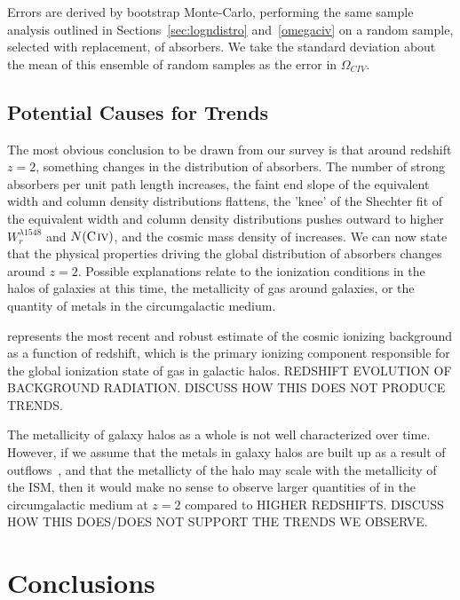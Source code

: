 \documentclass[linenumbers,twocolumn]{aastex61}
\begin{document}
Errors are derived by bootstrap Monte-Carlo, performing the same sample analysis outlined in Sections~\ref{sec:logndistro} and~\ref{omegaciv} on a random sample, selected with replacement, of {\CIV} absorbers.  We take the standard deviation about the mean of this ensemble of random samples as the error in $\Omega_{CIV}$.

\subsection{Potential Causes for Trends}
\label{trendcauses}

The most obvious conclusion to be drawn from our {\CIV} survey is that around redshift $z = 2$, something changes in the distribution of {\CIV} absorbers. The number of strong absorbers per unit path length increases, the faint end slope of the equivalent width and column density distributions flattens, the 'knee' of the Shechter fit of the equivalent width and column density distributions pushes outward to higher $W_r^{\lambda1548}$ and $N(\hbox{{\rm C}\kern 0.1em{\sc iv}})$, and the cosmic mass density of {\CIV} increases. We can now state that the physical properties driving the global distribution of {\CIV} absorbers changes around $z = 2$. Possible explanations relate to the ionization conditions in the halos of galaxies at this time, the metallicity of gas around galaxies, or the quantity of metals in the circumgalactic medium.

\cite{Haardt2012} represents the most recent and robust estimate of the cosmic ionizing background as a function of redshift, which is the primary ionizing component responsible for the global ionization state of gas in galactic halos. REDSHIFT EVOLUTION OF BACKGROUND RADIATION. DISCUSS HOW THIS DOES NOT PRODUCE TRENDS.

The metallicity of galaxy halos as a whole is not well characterized over time. However, if we assume that the metals in galaxy halos are built up as a result of outflows~\citep{Quiret2016}, and that the metallicty of the halo may scale with the metallicity of the ISM, then it would make no sense to observe larger quantities of {\CIV} in the circumgalactic medium at $z = 2$ compared to HIGHER REDSHIFTS. DISCUSS HOW THIS DOES/DOES NOT SUPPORT THE TRENDS WE OBSERVE.

\section{Conclusions}
\label{sec:conclusions}
\end{document}
